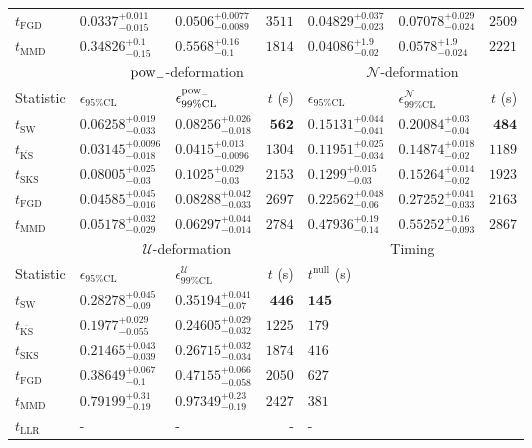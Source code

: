 \begin{tabular}{l|llr|llr}
	$t_{\mathrm{FGD}}$ & ${\mathbf{0.0337_{-0.015}^{+0.011}}}$ & ${\mathbf{0.0506_{-0.0089}^{+0.0077}}}$ & $3511$ & $0.04829_{-0.023}^{+0.037}$ & $0.07078_{-0.024}^{+0.029}$ & $2509$ \\
	$t_{\mathrm{MMD}}$ & $0.34826_{-0.15}^{+0.1}$ & $0.5568_{-0.1}^{+0.16}$ & $1814$ & $0.04086_{-0.02}^{+1.9}$ & $0.0578_{-0.024}^{+1.9}$ & $2221$ \\
	\toprule
	\multicolumn{1}{c}{} & \multicolumn{3}{c}{$\rm{pow}_{-}$-deformation} & \multicolumn{3}{c}{$\mathcal{N}$-deformation} \\
	Statistic & $\epsilon_{95\%\mathrm{CL}}$ & $\epsilon^  {\rm{pow}_{-}}_{99\%\mathrm{CL}}$ & $t$ (s) & $\epsilon_{95\%\mathrm{CL}}$ & $\epsilon^    {\mathcal{N}}_{99\%\mathrm{CL}}$ & $t$ (s) \\
	\midrule
	$t_{\mathrm{SW}}$ & $0.06258_{-0.033}^{+0.019}$ & $0.08256_{-0.018}^{+0.026}$ & ${\mathbf{562}}$ & $0.15131_{-0.041}^{+0.044}$ & $0.20084_{-0.04}^{+0.03}$ & ${\mathbf{484}}$ \\
	$t_{\overline{\mathrm{KS}}}$ & ${\mathbf{0.03145_{-0.018}^{+0.0096}}}$ & ${\mathbf{0.0415_{-0.0096}^{+0.013}}}$ & $1304$ & ${\mathbf{0.11951_{-0.034}^{+0.025}}}$ & ${\mathbf{0.14874_{-0.02}^{+0.018}}}$ & $1189$ \\
	$t_{\mathrm{SKS}}$ & $0.08005_{-0.03}^{+0.025}$ & $0.1025_{-0.03}^{+0.029}$ & $2153$ & $0.1299_{-0.03}^{+0.015}$ & $0.15264_{-0.02}^{+0.014}$ & $1923$ \\
	$t_{\mathrm{FGD}}$ & $0.04585_{-0.016}^{+0.045}$ & $0.08288_{-0.033}^{+0.042}$ & $2697$ & $0.22562_{-0.06}^{+0.048}$ & $0.27252_{-0.033}^{+0.041}$ & $2163$ \\
	$t_{\mathrm{MMD}}$ & $0.05178_{-0.029}^{+0.032}$ & $0.06297_{-0.014}^{+0.044}$ & $2784$ & $0.47936_{-0.14}^{+0.19}$ & $0.55252_{-0.093}^{+0.16}$ & $2867$ \\
	\toprule
	\multicolumn{1}{c}{} & \multicolumn{3}{c}{$\mathcal{U}$-deformation} & \multicolumn{3}{c}{Timing} \\
	Statistic & $\epsilon_{95\%\mathrm{CL}}$ & $\epsilon^    {\mathcal{U}}_{99\%\mathrm{CL}}$ & $t$ (s) & $t^{\mathrm{null}}$ (s) \\
	\midrule
	$t_{\mathrm{SW}}$ & $0.28278_{-0.09}^{+0.045}$ & $0.35194_{-0.07}^{+0.041}$ & ${\mathbf{446}}$ & ${\mathbf{145}}$ \\
	$t_{\overline{\mathrm{KS}}}$ & ${\mathbf{0.1977_{-0.055}^{+0.029}}}$ & ${\mathbf{0.24605_{-0.032}^{+0.029}}}$ & $1225$ & $179$ \\
	$t_{\mathrm{SKS}}$ & $0.21465_{-0.039}^{+0.043}$ & $0.26715_{-0.034}^{+0.032}$ & $1874$ & $416$ \\
	$t_{\mathrm{FGD}}$ & $0.38649_{-0.1}^{+0.067}$ & $0.47155_{-0.058}^{+0.066}$ & $2050$ & $627$ \\
	$t_{\mathrm{MMD}}$ & $0.79199_{-0.19}^{+0.31}$ & $0.97349_{-0.19}^{+0.23}$ & $2427$ & $381$ \\
	$t_{\mathrm{LLR}}$ & - & - & - & - \\
	\bottomrule
\end{tabular}